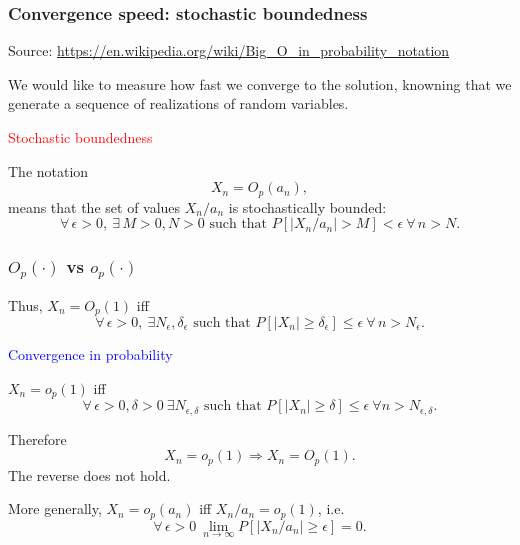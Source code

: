 \documentclass[usepdftitle=false, aspectratio=169]{beamer}
\begin{document}
\begin{frame}
\frametitle{Convergence speed: stochastic boundedness}

Source: \url{https://en.wikipedia.org/wiki/Big_O_in_probability_notation}

\mbox{}

We would like to measure how fast we converge to the solution, knowning that we generate a sequence of realizations of random variables.

\mbox{}

\textcolor{red}{Stochastic boundedness}

The notation
$$
X_{n}=O_{p}(a_{n}),
$$
means that the set of values $X_n/a_n$ is stochastically bounded:
$$
\forall\, \epsilon > 0,\ \exists\, M > 0, N > 0 \text{ such that } P[|X_{n}/a_{n}|>M ] < \epsilon \ \forall\, n > N.
$$

\end{frame}

\begin{frame}
\frametitle{$O_p(\cdot)$ vs $o_p(\cdot)$}

Thus, $X_n = O_p(1)$ iff
$$
\forall\, \epsilon > 0,\ \exists N_{\epsilon}, \delta_{\epsilon} \text{ such that } P[|X_{n} | \geq \delta_{\epsilon }] \leq \epsilon \ \forall\, n > N_{\epsilon}.
$$

\mbox{}

\textcolor{blue}{Convergence in probability}

$X_n = o_p(1)$ iff
$$
\forall\, \epsilon > 0, \delta > 0 \ \exists N_{\epsilon ,\delta } \text{ such that } P[|X_{n}|\geq \delta] \leq \epsilon \ \forall n > N_{\epsilon, \delta}.
$$

\mbox{}

Therefore
$$
X_n = o_p(1) \Rightarrow X_n = O_p(1).
$$
The reverse does not hold.

\mbox{}

More generally, $X_n = o_p(a_n)$ iff $X_n/{a_n} = o_p(1)$, i.e.
$$
\forall\, \epsilon > 0\ \lim_{n \rightarrow \infty} P[ |X_{n}/{a_n}| \geq \epsilon ] = 0.
$$

\end{frame}
\end{document}
